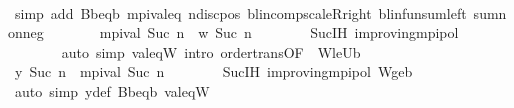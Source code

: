 \begin{isabellebody}
\ \ \ \ \ \ \isamarkupfalse%
\ {\isacharasterisk}{\kern0pt}\isanewline
\ \ \ \ \ \ \isamarkupfalse%
\ {\isacharparenleft}{\kern0pt}simp\ add{\isacharcolon}{\kern0pt}\ B\isactrlsub b{\isacharunderscore}{\kern0pt}eq{\isacharunderscore}{\kern0pt}{\isasymL}\isactrlsub b\ mpi{\isacharunderscore}{\kern0pt}val{\isacharunderscore}{\kern0pt}eq\ {\isasymP}n{\isacharunderscore}{\kern0pt}disc{\isacharunderscore}{\kern0pt}pos\ blincomp{\isacharunderscore}{\kern0pt}scaleR{\isacharunderscore}{\kern0pt}right\ blinfun{\isachardot}{\kern0pt}sum{\isacharunderscore}{\kern0pt}left\ sum{\isacharunderscore}{\kern0pt}nonneg{\isacharparenright}{\kern0pt}\isanewline
\ \ \ \ \isamarkupfalse%
\ \isamarkupfalse%
\ {\isachardoublequoteopen}mpi{\isacharunderscore}{\kern0pt}val\ {\isacharparenleft}{\kern0pt}Suc\ n{\isacharparenright}{\kern0pt}\ {\isasymle}\ w\ {\isacharparenleft}{\kern0pt}Suc\ n{\isacharparenright}{\kern0pt}{\isachardoublequoteclose}\isanewline
\ \ \ \ \ \ \isamarkupfalse%
\ Suc{\isachardot}{\kern0pt}IH\ {\isasymnu}{\isacharunderscore}{\kern0pt}improving{\isacharunderscore}{\kern0pt}mpi{\isacharunderscore}{\kern0pt}pol\ \isanewline
\ \ \ \ \ \ \isamarkupfalse%
\ {\isacharparenleft}{\kern0pt}auto\ simp{\isacharcolon}{\kern0pt}\ val{\isacharunderscore}{\kern0pt}eq{\isacharunderscore}{\kern0pt}W\ intro{\isacharcolon}{\kern0pt}\ order{\isachardot}{\kern0pt}trans{\isacharbrackleft}{\kern0pt}OF\ {\isacharunderscore}{\kern0pt}\ W{\isacharunderscore}{\kern0pt}le{\isacharunderscore}{\kern0pt}U\isactrlsub b{\isacharbrackright}{\kern0pt}{\isacharparenright}{\kern0pt}\isanewline
\ \ \ \ \isamarkupfalse%
\ \isamarkupfalse%
\ {\isachardoublequoteopen}y\ {\isacharparenleft}{\kern0pt}Suc\ n{\isacharparenright}{\kern0pt}\ {\isasymle}\ mpi{\isacharunderscore}{\kern0pt}val\ {\isacharparenleft}{\kern0pt}Suc\ n{\isacharparenright}{\kern0pt}{\isachardoublequoteclose}\isanewline
\ \ \ \ \ \ \isamarkupfalse%
\ Suc{\isachardot}{\kern0pt}IH\ {\isasymnu}{\isacharunderscore}{\kern0pt}improving{\isacharunderscore}{\kern0pt}mpi{\isacharunderscore}{\kern0pt}pol\ W{\isacharunderscore}{\kern0pt}ge{\isacharunderscore}{\kern0pt}{\isasymL}\isactrlsub b\isanewline
\ \ \ \ \ \ \isamarkupfalse%
\ {\isacharparenleft}{\kern0pt}auto\ simp{\isacharcolon}{\kern0pt}\ y{\isacharunderscore}{\kern0pt}def\ B\isactrlsub b{\isacharunderscore}{\kern0pt}eq{\isacharunderscore}{\kern0pt}{\isasymL}\isactrlsub b\ val{\isacharunderscore}{\kern0pt}eq{\isacharunderscore}{\kern0pt}W{\isacharparenright}{\kern0pt}\isanewline

\end{isabellebody}
